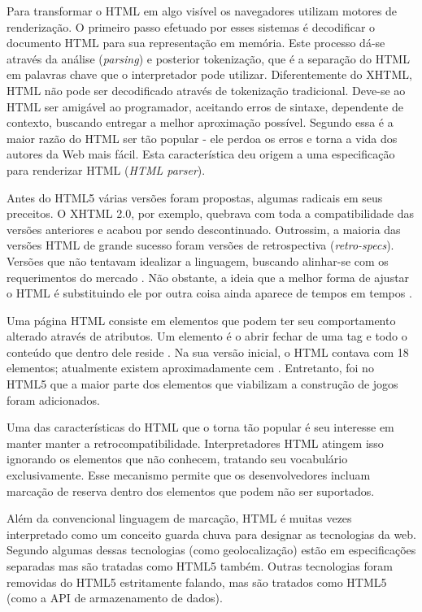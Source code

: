 Para transformar o HTML em algo visível os navegadores utilizam motores
de renderização. O primeiro passo efetuado por esses sistemas é
decodificar o documento HTML para sua representação em memória. Este
processo dá-se através da análise (\textit{parsing}) e posterior
tokenização, que é a separação do HTML em palavras chave que o
interpretador pode utilizar. Diferentemente do XHTML, HTML não pode
ser decodificado através de tokenização tradicional. Deve-se ao HTML
ser amigável ao programador, aceitando erros de sintaxe, dependente
de contexto, buscando entregar a melhor aproximação possível. 
Segundo \citet{howBrowsersWork} essa é a maior razão do HTML ser tão popular - 
ele perdoa os erros e torna a vida dos autores da Web mais fácil. Esta
característica deu origem a uma especificação para renderizar HTML
(\textit{HTML parser}).

Antes do HTML5 várias versões foram propostas, algumas radicais
em seus preceitos. O XHTML 2.0, por exemplo, quebrava com toda
a compatibilidade das versões anteriores e acabou por sendo descontinuado.
Outrossim, a maioria das versões HTML de grande sucesso foram versões de
retrospectiva (\textit{retro-specs}). Versões que não tentavam
idealizar a linguagem, buscando alinhar-se com os requerimentos do
mercado \autocite{diveIntohtml}. Não obstante, a ideia que a melhor forma
de ajustar o HTML é substituindo ele por outra coisa ainda aparece de tempos
em tempos \autocite{diveIntohtml}.

Uma página HTML consiste em elementos que podem ter seu comportamento
alterado através de atributos. Um elemento é o abrir fechar de
uma tag e todo o conteúdo que dentro dele reside \autocite[p.
10--11]{htmlAndCssDucket}. Na sua versão inicial, o HTML
contava com 18 elementos; atualmente existem aproximadamente cem
\autocite{diveIntohtml}. Entretanto, foi no HTML5 que a maior parte dos
elementos que viabilizam a construção de jogos foram adicionados.

Uma das características do HTML que o torna tão popular é seu
interesse em manter manter a retrocompatibilidade. Interpretadores
HTML atingem isso ignorando os elementos que não conhecem, tratando
seu vocabulário exclusivamente. Esse mecanismo permite que os
desenvolvedores incluam marcação de reserva dentro dos elementos
que podem não ser suportados.

Além da convencional linguagem de marcação, HTML é muitas vezes
interpretado como um conceito guarda chuva para designar as tecnologias
da web. Segundo \citet{diveIntohtml} algumas dessas tecnologias (como
geolocalização) estão em especificações separadas mas são
tratadas como HTML5 também. Outras tecnologias foram removidas do
HTML5 estritamente falando, mas são tratados como HTML5 (como a API de
armazenamento de dados).

